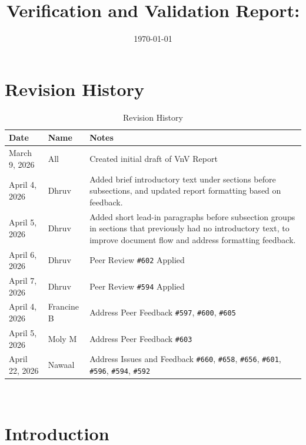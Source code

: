 \documentclass[12pt, titlepage]{article}
\begin{document}
\title{Verification and Validation Report: \progname}
\author{\authname}
\date{\today}

\maketitle


\section{Revision History}

\begin{table}[H]
  \centering
  \caption{Revision History}
  \label{tab:revision-history}
  \begin{tabularx}{\textwidth}{p{3cm}p{2cm}X}
    \toprule {\bf Date} & {\bf Name} & {\bf Notes}\\
    \midrule
    March 9, 2026 & All & Created initial draft of VnV Report\\
    April 4, 2026 & Dhruv & Added brief introductory text under
    sections before subsections, and updated report formatting based
    on feedback.\\
    April 5, 2026 & Dhruv & Added short lead-in paragraphs before
    subsection groups in sections that previously had no introductory
    text, to improve document flow and address formatting feedback.\\
    April 6, 2026 & Dhruv & Peer Review \texttt{\#602} Applied\\
    April 7, 2026 & Dhruv & Peer Review \texttt{\#594} Applied\\
    April 4, 2026 & Francine B & Address Peer Feedback
    \texttt{\#597}, \texttt{\#600}, \texttt{\#605} \\
    April 5, 2026 & Moly M & Address Peer Feedback \texttt{\#603}\\
    April 22, 2026 & Nawaal & Address Issues and Feedback
    \texttt{\#660}, \texttt{\#658}, \texttt{\#656}, \texttt{\#601},
    \texttt{\#596}, \texttt{\#594}, \texttt{\#592}\\
    \bottomrule
  \end{tabularx}
\end{table}

~\newpage

\section{Introduction}
\end{document}
